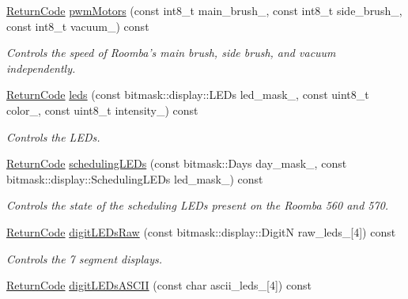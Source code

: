 \begin{DoxyCompactItemize}
\hyperlink{classroomba_1_1series500_1_1oi_1_1_o_i_encoder_ac2c8ad2f0306050926f89882d74696cc}{Return\+Code} \hyperlink{classroomba_1_1series500_1_1oi_1_1_o_i_encoder_aee910e2a71de7ecab2367cbfcd621fed}{pwm\+Motors} (const int8\+\_\+t main\+\_\+brush\+\_\+, const int8\+\_\+t side\+\_\+brush\+\_\+, const int8\+\_\+t vacuum\+\_\+) const 
\begin{DoxyCompactList}\small\item\em Controls the speed of Roomba’s main brush, side brush, and vacuum independently. \end{DoxyCompactList}\item 
\hyperlink{classroomba_1_1series500_1_1oi_1_1_o_i_encoder_ac2c8ad2f0306050926f89882d74696cc}{Return\+Code} \hyperlink{classroomba_1_1series500_1_1oi_1_1_o_i_encoder_a4f382fc939dad7b6a9618e36a5cf4d47}{leds} (const bitmask\+::display\+::\+L\+E\+Ds led\+\_\+mask\+\_\+, const uint8\+\_\+t color\+\_\+, const uint8\+\_\+t intensity\+\_\+) const 
\begin{DoxyCompactList}\small\item\em Controls the L\+E\+Ds. \end{DoxyCompactList}\item 
\hyperlink{classroomba_1_1series500_1_1oi_1_1_o_i_encoder_ac2c8ad2f0306050926f89882d74696cc}{Return\+Code} \hyperlink{classroomba_1_1series500_1_1oi_1_1_o_i_encoder_a42fe70c13a369206c439002c5859a27d}{scheduling\+L\+E\+Ds} (const bitmask\+::\+Days day\+\_\+mask\+\_\+, const bitmask\+::display\+::\+Scheduling\+L\+E\+Ds led\+\_\+mask\+\_\+) const 
\begin{DoxyCompactList}\small\item\em Controls the state of the scheduling L\+E\+Ds present on the Roomba 560 and 570. \end{DoxyCompactList}\item 
\hyperlink{classroomba_1_1series500_1_1oi_1_1_o_i_encoder_ac2c8ad2f0306050926f89882d74696cc}{Return\+Code} \hyperlink{classroomba_1_1series500_1_1oi_1_1_o_i_encoder_aafaa740b0a3d1214e351623fa736ed82}{digit\+L\+E\+Ds\+Raw} (const bitmask\+::display\+::\+Digit\+N raw\+\_\+leds\+\_\+\mbox{[}4\mbox{]}) const 
\begin{DoxyCompactList}\small\item\em Controls the 7 segment displays. \end{DoxyCompactList}\item 
\hyperlink{classroomba_1_1series500_1_1oi_1_1_o_i_encoder_ac2c8ad2f0306050926f89882d74696cc}{Return\+Code} \hyperlink{classroomba_1_1series500_1_1oi_1_1_o_i_encoder_ae660ba123459c7fcdef6b8db247e56cf}{digit\+L\+E\+Ds\+A\+S\+C\+I\+I} (const char ascii\+\_\+leds\+\_\+\mbox{[}4\mbox{]}) const 

\end{DoxyCompactItemize}
